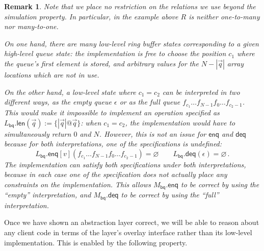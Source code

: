 \documentclass[11pt,oneside]{book}
\newtheorem{remark}[theorem]{Remark}
\theoremstyle{definition}
\newcommand{\kw}[1]{\ensuremath{ \mathsf{#1} }}
\begin{document}
\begin{remark} %
Note that we place no restriction
on the relations we use
beyond the simulation property.
In particular, in the example above
$R$ is neither one-to-many nor many-to-one.

On one hand,
there are many low-level ring buffer states corresponding to
a given high-level queue state:
the implementation is free to choose the position $c_1$
where the queue's first element is stored,
and arbitrary values for the $N - |\vec{q}|$
array locations which are not in use.

On the other hand,
a low-level state where $c_1 = c_2$
can be interpreted in two different ways,
as the empty queue $\epsilon$ or
as the full queue $f_{c_1} \ldots f_{N-1} f_0 \ldots f_{c_2 - 1}$.
This would make it impossible to implement
an operation specified as
$L_\kw{bq}.\kw{len}(\vec{q}) := \{ |\vec{q}|@\vec{q} \}$:
when $c_1 = c_2$,
the implementation
would have to simultaneously
return $0$ and $N$.
However,
this is not an issue for $\kw{enq}$ and $\kw{deq}$ because
for both interpretations,
one of the specifications is undefined:
\[
  L_\kw{bq}.\kw{enq}[v](f_{c_1} \ldots f_{N-1} f_0 \ldots f_{c_2 - 1})
  =
  \varnothing
  \qquad
  L_\kw{bq}.\kw{deq}(\epsilon)
  =
  \varnothing
  \,.
\]
The implementation can satisfy both specifications
under both interpretations,
because in each case one of
the specification does not actually place
any constraints on the implementation.
This allows
$M_\kw{bq}.\kw{enq}$ to be correct
by using the ``empty'' interpretation, and
$M_\kw{bq}.\kw{deq}$ to be correct
by using the ``full'' interpretation.
\end{remark}

Once we have shown an abstraction layer correct,
we will be able to reason about any client code
in terms of the layer's overlay interface
rather than its low-level implementation.
This is enabled by the following property.
\end{document}
